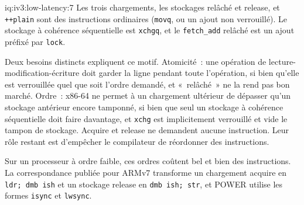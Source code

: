 \begin{solution}{iq:iv3:low-latency:7}
Les trois chargements, les stockages relâché et release, et \texttt{++plain} sont des instructions ordinaires (\texttt{movq}, ou un ajout non verrouillé). Le stockage à cohérence séquentielle est \texttt{xchgq}, et le \texttt{fetch\_add} relâché est un ajout préfixé par \texttt{lock}.

Deux besoins distincts expliquent ce motif. Atomicité~: une opération de lecture-modification-écriture doit garder la ligne pendant toute l'opération, si bien qu'elle est verrouillée quel que soit l'ordre demandé, et «~relâché~» ne la rend pas bon marché. Ordre~: x86-64 ne permet à un chargement ultérieur de dépasser qu'un stockage antérieur encore tamponné, si bien que seul un stockage à cohérence séquentielle doit faire davantage, et \texttt{xchg} est implicitement verrouillé et vide le tampon de stockage. Acquire et release ne demandent aucune instruction. Leur rôle restant est d'empêcher le compilateur de réordonner des instructions.

Sur un processeur à ordre faible, ces ordres coûtent bel et bien des instructions. La correspondance publiée pour ARMv7 transforme un chargement acquire en \texttt{ldr; dmb ish} et un stockage release en \texttt{dmb ish; str}, et POWER utilise les formes \texttt{isync} et \texttt{lwsync}.

\end{solution}

